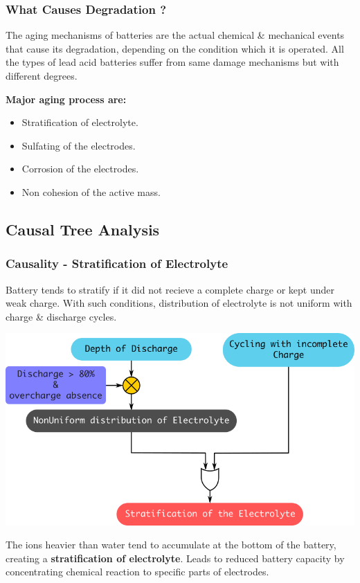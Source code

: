 \documentclass{beamer}
\begin{document}
\begin{frame}     %
  \frametitle{What Causes Degradation ?}
  \fontsize{8pt}{12}\selectfont
  
  The aging mechanisms of batteries are the actual chemical \& mechanical events that cause its degradation, depending on the condition which it is operated. All the types of lead acid
  batteries suffer from same damage mechanisms but with different degrees.
  
  \bigskip
  \bigskip
  \textbf{Major aging process are:}
  \begin{itemize}
    \item Stratification of electrolyte.
    \item Sulfating of the electrodes.
    \item Corrosion of the electrodes.
    \item Non cohesion of the active mass.
  \end{itemize}
  
\end{frame}


\subsection{Causal Tree Analysis}          %

\begin{frame}     %
  \frametitle{Causality - Stratification of Electrolyte}
  \fontsize{8pt}{12}\selectfont
  \vspace{-10pt}
  Battery tends to stratify if it did not recieve a complete charge or kept under weak charge. With such conditions, distribution of electrolyte is not uniform with charge \& discharge 
  cycles.
  \vspace{-10pt}
  \begin{center}
    \includegraphics[width=0.8\linewidth]{./Resources/Images/analysis_causality_stratification.png}
  \end{center}
  \vspace{-10pt}
  The ions heavier than water tend to accumulate at the bottom of the battery, creating a \textbf{stratification of electrolyte}. Leads to reduced battery capacity by 
  concentrating chemical reaction to specific parts of electrodes.
\end{frame}
\end{document}
